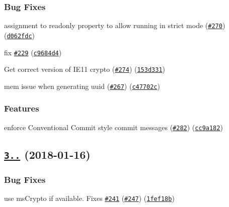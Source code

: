 \subsubsection*{Bug Fixes}


\begin{DoxyItemize}
\item assignment to readonly property to allow running in strict mode (\href{https://github.com/kelektiv/node-uuid/issues/270}{\tt \#270}) (\href{https://github.com/kelektiv/node-uuid/commit/d062fdc}{\tt d062fdc})
\item fix \href{https://github.com/kelektiv/node-uuid/issues/229}{\tt \#229} (\href{https://github.com/kelektiv/node-uuid/commit/c9684d4}{\tt c9684d4})
\item Get correct version of I\+E11 crypto (\href{https://github.com/kelektiv/node-uuid/issues/274}{\tt \#274}) (\href{https://github.com/kelektiv/node-uuid/commit/153d331}{\tt 153d331})
\item mem issue when generating uuid (\href{https://github.com/kelektiv/node-uuid/issues/267}{\tt \#267}) (\href{https://github.com/kelektiv/node-uuid/commit/c47702c}{\tt c47702c})
\end{DoxyItemize}

\subsubsection*{Features}


\begin{DoxyItemize}
\item enforce Conventional Commit style commit messages (\href{https://github.com/kelektiv/node-uuid/issues/282}{\tt \#282}) (\href{https://github.com/kelektiv/node-uuid/commit/cc9a182}{\tt cc9a182})
\end{DoxyItemize}

\label{_3.2.1}%
 \subsection*{\href{https://github.com/kelektiv/node-uuid/compare/v3.2.0...v3.2.1}{\tt 3..} (2018-\/01-\/16)}

\subsubsection*{Bug Fixes}


\begin{DoxyItemize}
\item use ms\+Crypto if available. Fixes \href{https://github.com/kelektiv/node-uuid/issues/241}{\tt \#241} (\href{https://github.com/kelektiv/node-uuid/issues/247}{\tt \#247}) (\href{https://github.com/kelektiv/node-uuid/commit/1fef18b}{\tt 1fef18b})
\end{DoxyItemize}

